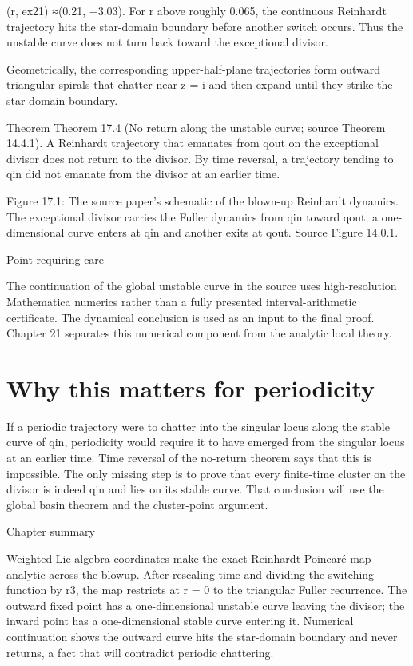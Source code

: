 (r, ex21) ≈(0.21, −3.03). For r above roughly 0.065, the continuous Reinhardt trajectory hits the star-domain boundary before another switch occurs. Thus the unstable curve does not turn back toward the exceptional divisor.


Geometrically, the corresponding upper-half-plane trajectories form outward triangular spirals that chatter near z = i and then expand until they strike the star-domain boundary.


\begin{statementbox}{Theorem}
Theorem 17.4 (No return along the unstable curve; source Theorem 14.4.1). A Reinhardt trajectory that emanates from qout on the exceptional divisor does not return to the divisor. By time reversal, a trajectory tending to qin did not emanate from the divisor at an earlier time.
\end{statementbox}

\begin{figureplaceholder}
Figure 17.1: The source paper’s schematic of the blown-up Reinhardt dynamics. The exceptional divisor carries the Fuller dynamics from qin toward qout; a one-dimensional curve enters at qin and another exits at qout. Source Figure 14.0.1.
\end{figureplaceholder}

\begin{insightbox}{Point requiring care}
\end{insightbox}

The continuation of the global unstable curve in the source uses high-resolution Mathematica numerics rather than a fully presented interval-arithmetic certificate. The dynamical conclusion is used as an input to the final proof. Chapter 21 separates this numerical component from the analytic local theory.


\section{Why this matters for periodicity}

If a periodic trajectory were to chatter into the singular locus along the stable curve of qin, periodicity would require it to have emerged from the singular locus at an earlier time. Time reversal of the no-return theorem says that this is impossible. The only missing step is to prove that every finite-time cluster on the divisor is indeed qin and lies on its stable curve. That conclusion will use the global basin theorem and the cluster-point argument.


\begin{insightbox}{Chapter summary}
\end{insightbox}

Weighted Lie-algebra coordinates make the exact Reinhardt Poincaré map analytic across the blowup. After rescaling time and dividing the switching function by r3, the map restricts at r = 0 to the triangular Fuller recurrence. The outward fixed point has a one-dimensional unstable curve leaving the divisor; the inward point has a one-dimensional stable curve entering it. Numerical continuation shows the outward curve hits the star-domain boundary and never returns, a fact that will contradict periodic chattering.

